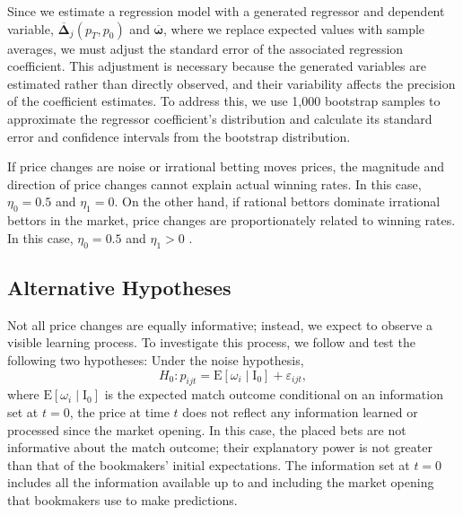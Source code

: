 \documentclass[webpdf,modern,medium]{oup-authoring-template}
\newcommand{\bs}{\boldsymbol}
\theoremstyle{thmstyleone}%
\theoremstyle{thmstyletwo}%
\theoremstyle{thmstylethree}%
\begin{document}
        Since we estimate a regression model with a generated regressor and dependent variable, \(\overline{\bs{\Delta}}_j(p_T, p_0)\) and $\overline{\bs{\omega}}$, where we replace expected values with sample averages, we must adjust the standard error of the associated regression coefficient. This adjustment is necessary because the generated variables are estimated rather than directly observed, and their variability affects the precision of the coefficient estimates. To address this, we use 1,000 bootstrap samples to approximate the regressor coefficient's distribution and calculate its standard error and confidence intervals from the bootstrap distribution.

        If price changes are noise or irrational betting moves prices, the magnitude and direction of price changes cannot explain actual winning rates. In this case, $\eta_{0} = 0.5$ and $\eta_{1} = 0$. On the other hand, if rational bettors dominate irrational bettors in the market, price changes are proportionately related to winning rates. In this case, $\eta_{0} = 0.5$ and $\eta_{1} > 0$ \citep{gandar1998}.

    \subsection{Alternative Hypotheses}

Not all price changes are equally informative; instead, we expect to observe a visible learning process. To investigate this process, we follow \citet{biais1999} and test the following two hypotheses:
%
Under the noise hypothesis,
\begin{equation}
    H_0: p_{ijt} = \mathrm{E}\left[\omega_i \mid \mathrm{I}_0\right] + \varepsilon_{ijt},
    \label{eq:noise_hypothesis}
\end{equation}
where $\mathrm{E}\left[\omega_i\mid\mathrm{I}_0\right]$ is the expected match outcome conditional on an information set at $t=0$, the price at time $t$ does not reflect any information learned or processed since the market opening. In this case, the placed bets are not informative about the match outcome; their explanatory power is not greater than that of the bookmakers' initial expectations. The information set at $t=0$ includes all the information available up to and including the market opening that bookmakers use to make predictions.
\end{document}
